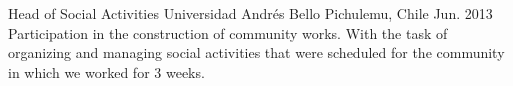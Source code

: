 

\begin{cventries}

  \cventry
    {Head of Social Activities} %
    {Universidad Andrés Bello} %
    {Pichulemu, Chile} %
    {Jun. 2013} %
    {
    	Participation in the construction of community works. With the task of organizing and managing social activities that were scheduled for the community in which we worked for 3 weeks.
    }

\end{cventries}

